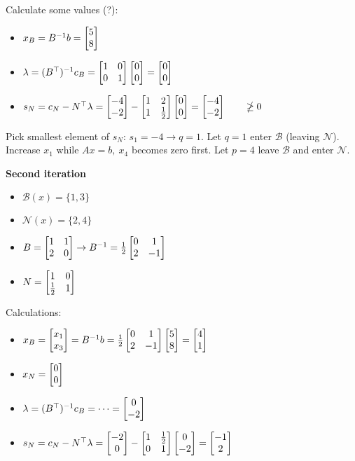 \documentclass{article}
\begin{document}
\medskip Calculate some values (?):
\begin{itemize}
  \item $x_B = B^{-1}b = \begin{bmatrix} 5  \\ 8 \end{bmatrix}$
  \item $\lambda = (B^{\top})^{-1}c_B = \begin{bmatrix} 1  & 0 \\ 0 & 1 \end{bmatrix}\begin{bmatrix} 0 \\ 0 \end{bmatrix} = \begin{bmatrix} 0 \\ 0 \end{bmatrix}$
  \item $s_N = c_N - N^{\top}\lambda = \begin{bmatrix} -4 \\ -2 \end{bmatrix}-\begin{bmatrix} 1 & 2 \\ 1 &  \frac{1}{2} \end{bmatrix}\begin{bmatrix} 0 \\ 0 \end{bmatrix} = \begin{bmatrix} -4 \\ -2 \end{bmatrix} \qquad \ngeq 0$
\end{itemize}

Pick smallest element of $s_N$: $s_1=-4 \rightarrow q = 1$. Let $q = 1$ enter $\mathcal{B}$ (leaving $\mathcal{N}$). Increase $x_1$ while $Ax=b,\  x_4$ becomes zero first. Let $p=4$ leave $\mathcal{B}$ and enter $\mathcal{N}$.

\medskip \textbf{Second iteration}
\begin{itemize}
  \item $\mathcal{B}(x) = \{1, 3\}$
  \item $\mathcal{N}(x) = \{2, 4\}$
  \item $B = \begin{bmatrix} 1 & 1 \\ 2 & 0 \end{bmatrix} \rightarrow B^{-1} = \frac{1}{2}\begin{bmatrix} 0 & 1 \\ 2 & -1 \end{bmatrix}$
  \item $N = \begin{bmatrix} 1 & 0 \\  \frac{1}{2} & 1 \end{bmatrix}$
\end{itemize}

Calculations: 
\begin{itemize}
  \item $x_B = \begin{bmatrix} x_1  \\ x_3 \end{bmatrix} = B^{-1}b = \frac{1}{2} \begin{bmatrix} 0 & 1 \\ 2 & -1 \end{bmatrix}\begin{bmatrix} 5 \\ 8 \end{bmatrix} = \begin{bmatrix} 4 \\ 1 \end{bmatrix}$
  \item $x_N = \begin{bmatrix} 0  \\ 0 \end{bmatrix}$
  \item $\lambda = (B^{\top})^{-1}c_B = \dots = \begin{bmatrix} 0 \\ -2 \end{bmatrix}$
  \item $s_N = c_N - N^{\top}\lambda = \begin{bmatrix} -2 \\ 0 \end{bmatrix}- \begin{bmatrix} 1 &  \frac{1}{2} \\ 0 & 1 \end{bmatrix}\begin{bmatrix} 0 \\ -2 \end{bmatrix} = \begin{bmatrix} -1 \\ 2 \end{bmatrix}$
\end{itemize}
\end{document}
